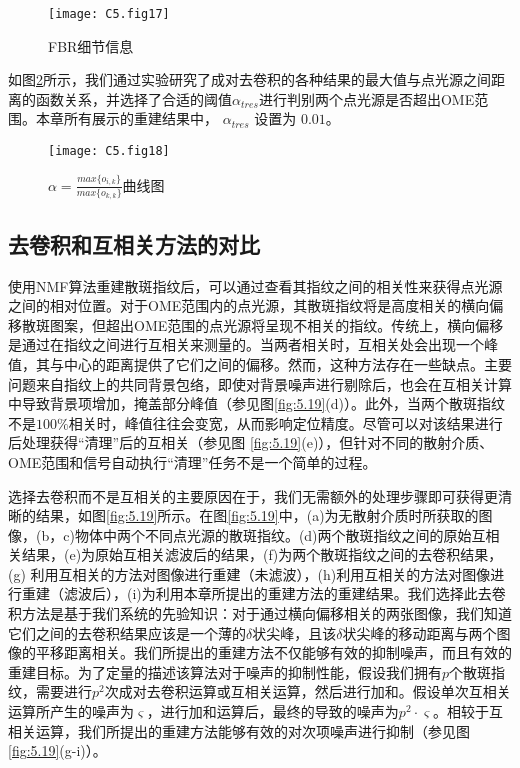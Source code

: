 \begin{figure}[htp]
	\centering
	\texttt{[image: C5.fig17]}
	\caption{FBR细节信息}
	\label{fig:5.17}
\end{figure}

如图\ref{fig:5.18}所示，我们通过实验研究了成对去卷积的各种结果的最大值与点光源之间距离的函数关系，并选择了合适的阈值$\alpha_{tres}$进行判别两个点光源是否超出OME范围。本章所有展示的重建结果中， $\alpha_{tres}$ 设置为 $0.01$。

\begin{figure}[htp]
	\centering
	\texttt{[image: C5.fig18]}
	\caption{$\alpha= \frac {max\{o_{i,k}\}} {max\{o_{k,k}\}}$曲线图}
	\label{fig:5.18}
\end{figure}

\subsection{去卷积和互相关方法的对比}

使用NMF算法重建散斑指纹后，可以通过查看其指纹之间的相关性来获得点光源之间的相对位置。对于OME范围内的点光源，其散斑指纹将是高度相关的横向偏移散斑图案，但超出OME范围的点光源将呈现不相关的指纹。传统上，横向偏移是通过在指纹之间进行互相关来测量的。当两者相关时，互相关处会出现一个峰值，其与中心的距离提供了它们之间的偏移。然而，这种方法存在一些缺点。主要问题来自指纹上的共同背景包络，即使对背景噪声进行剔除后，也会在互相关计算中导致背景项增加，掩盖部分峰值（参见图\ref{fig:5.19}(d)）。此外，当两个散斑指纹不是$100 \%$相关时，峰值往往会变宽，从而影响定位精度。尽管可以对该结果进行后处理获得“清理”后的互相关（参见图 \ref{fig:5.19}(e)），但针对不同的散射介质、OME范围和信号自动执行“清理”任务不是一个简单的过程。

选择去卷积而不是互相关的主要原因在于，我们无需额外的处理步骤即可获得更清晰的结果，如图\ref{fig:5.19}所示。在图\ref{fig:5.19}中，(a)为无散射介质时所获取的图像，(b，c)物体中两个不同点光源的散斑指纹。(d)两个散斑指纹之间的原始互相关结果，(e)为原始互相关滤波后的结果，(f)为两个散斑指纹之间的去卷积结果，(g) 利用互相关的方法对图像进行重建（未滤波），(h)利用互相关的方法对图像进行重建（滤波后），(i)为利用本章所提出的重建方法的重建结果。我们选择此去卷积方法是基于我们系统的先验知识：对于通过横向偏移相关的两张图像，我们知道它们之间的去卷积结果应该是一个薄的$\delta$状尖峰，且该$\delta$状尖峰的移动距离与两个图像的平移距离相关。我们所提出的重建方法不仅能够有效的抑制噪声，而且有效的重建目标。为了定量的描述该算法对于噪声的抑制性能，假设我们拥有$p$个散斑指纹，需要进行$p^2$次成对去卷积运算或互相关运算，然后进行加和。假设单次互相关运算所产生的噪声为$\varsigma$，进行加和运算后，最终的导致的噪声为$p^2 \cdot \varsigma$。相较于互相关运算，我们所提出的重建方法能够有效的对次项噪声进行抑制（参见图\ref{fig:5.19}(g-i)）。


